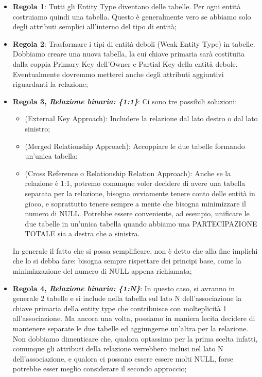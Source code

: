 \begin{itemize}

\item{\textbf{Regola 1}}: Tutti gli Entity Type diventano delle tabelle. Per ogni entità costruiamo quindi una tabella. Questo è generalmente vero se abbiamo solo degli attributi semplici all'interno del tipo di entità;  

\item{\textbf{Regola 2}}: Trasformare i tipi di entità deboli (Weak Entity Type) in tabelle. Dobbiamo creare una nuova tabella, la cui chiave primaria sarà costituita dalla coppia Primary Key dell'Owner e Partial Key della entità debole. Eventualmente dovremmo metterci anche degli attributi aggiuntivi riguardanti la relazione; 
 
\item{\textbf{Regola 3, \textit{Relazione binaria: \{1:1\}}}}: Ci sono tre possibili soluzioni:

\begin{itemize}

\item{(External Key Approach)}: Includere la relazione dal lato destro o dal lato sinistro;
\item{(Merged Relationship Approach)}: Accoppiare le due tabelle formando un'unica tabella;
\item{(Cross Reference o Relationship Relation Approach)}: Anche se la relazione è 1:1, potremo comunque voler decidere di avere una tabella separata per la relazione, bisogna ovviamente tenere conto delle entità in gioco, e soprattutto tenere sempre a mente che bisogna minimizzare il numero di NULL. Potrebbe essere conveniente, ad esempio, unificare le due tabelle in un’unica tabella quando abbiamo una PARTECIPAZIONE TOTALE sia a destra che a sinistra.

\end{itemize}

In generale il fatto che si possa semplificare, non è detto che alla fine implichi che lo si debba fare: bisogna sempre rispettare dei principi base, come la minimizzazione del numero di NULL appena richiamata;  

\item{\textbf{Regola 4, \textit{Relazione binaria: \{1:N\}}}}: In questo caso, si avranno in generale 2 tabelle e si include nella tabella sul lato N dell’associazione la chiave primaria della entity type che contribuisce con molteplicità 1 all’associazione. Ma ancora una volta, possiamo in maniera lecita decidere di mantenere separate le due tabelle ed aggiungerne un'altra per la relazione. Non dobbiamo dimenticare che, qualora optassimo per la prima scelta infatti, comunque gli attributi della relazione verrebbero inclusi nel lato N dell’associazione, e qualora ci possano essere essere molti NULL, forse potrebbe esser meglio considerare il secondo approccio;


\end{itemize}
